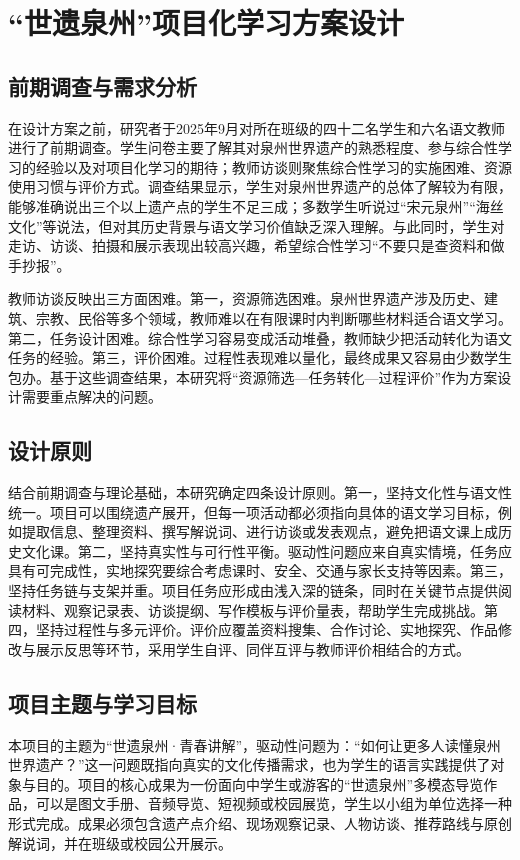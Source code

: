\chapter{“世遗泉州”项目化学习方案设计}

\section{前期调查与需求分析}

在设计方案之前，研究者于2025年9月对所在班级的四十二名学生和六名语文教师进行了前期调查。学生问卷主要了解其对泉州世界遗产的熟悉程度、参与综合性学习的经验以及对项目化学习的期待；教师访谈则聚焦综合性学习的实施困难、资源使用习惯与评价方式。调查结果显示，学生对泉州世界遗产的总体了解较为有限，能够准确说出三个以上遗产点的学生不足三成；多数学生听说过“宋元泉州”“海丝文化”等说法，但对其历史背景与语文学习价值缺乏深入理解。与此同时，学生对走访、访谈、拍摄和展示表现出较高兴趣，希望综合性学习“不要只是查资料和做手抄报”。

教师访谈反映出三方面困难。第一，资源筛选困难。泉州世界遗产涉及历史、建筑、宗教、民俗等多个领域，教师难以在有限课时内判断哪些材料适合语文学习。第二，任务设计困难。综合性学习容易变成活动堆叠，教师缺少把活动转化为语文任务的经验。第三，评价困难。过程性表现难以量化，最终成果又容易由少数学生包办。基于这些调查结果，本研究将“资源筛选—任务转化—过程评价”作为方案设计需要重点解决的问题。

\section{设计原则}

结合前期调查与理论基础，本研究确定四条设计原则。第一，坚持文化性与语文性统一。项目可以围绕遗产展开，但每一项活动都必须指向具体的语文学习目标，例如提取信息、整理资料、撰写解说词、进行访谈或发表观点，避免把语文课上成历史文化课。第二，坚持真实性与可行性平衡。驱动性问题应来自真实情境，任务应具有可完成性，实地探究要综合考虑课时、安全、交通与家长支持等因素。第三，坚持任务链与支架并重。项目任务应形成由浅入深的链条，同时在关键节点提供阅读材料、观察记录表、访谈提纲、写作模板与评价量表，帮助学生完成挑战。第四，坚持过程性与多元评价。评价应覆盖资料搜集、合作讨论、实地探究、作品修改与展示反思等环节，采用学生自评、同伴互评与教师评价相结合的方式。

\section{项目主题与学习目标}

本项目的主题为“世遗泉州·青春讲解”，驱动性问题为：“如何让更多人读懂泉州世界遗产？”这一问题既指向真实的文化传播需求，也为学生的语言实践提供了对象与目的。项目的核心成果为一份面向中学生或游客的“世遗泉州”多模态导览作品，可以是图文手册、音频导览、短视频或校园展览，学生以小组为单位选择一种形式完成。成果必须包含遗产点介绍、现场观察记录、人物访谈、推荐路线与原创解说词，并在班级或校园公开展示。

